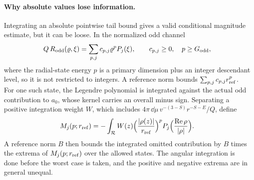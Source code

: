 \paragraph{Why absolute values lose information.} Integrating an absolute pointwise tail bound gives a valid
conditional magnitude estimate, but it can be loose. In the normalized odd channel
\begin{equation}
 Q\,R_{\rm odd}(\varrho,\xi)=\sum_{p,j}c_{p,j}\varrho^pP_j(\xi),\qquad c_{p,j}\ge0,\quad p\ge G_{\rm odd},
 \label{sri:eq:cone:states}
\end{equation}
where the radial-state energy $p$ is a primary dimension plus an integer descendant level, so it is not restricted to
integers. A reference norm bounds $\sum_{p,j}c_{p,j}r_{\rm ref}^p$. For one such state, the Legendre polynomial is
integrated against the actual odd contribution to $a_0$, whose kernel carries an overall minus sign. Separating a
positive integration weight $W$, which includes $4\pi\,\dd\mu\,v^{-(3-S)}r^{-S-E}/Q$, define
\begin{equation}
 M_j(p;r_{\rm ref})=-\int_{\mathcal R}W(z)\Bigl(\frac{|\rho(z)|}{r_{\rm ref}}\Bigr)^pP_j\Bigl(\frac{\operatorname{Re}\rho}{|\rho|}\Bigr).
\end{equation}
A reference norm $B$ then bounds the integrated omitted contribution by $B$ times the extrema of
$M_j(p;r_{\rm ref})$ over the allowed states. The angular integration is done before the worst case is taken, and the
positive and negative extrema are in general unequal.

